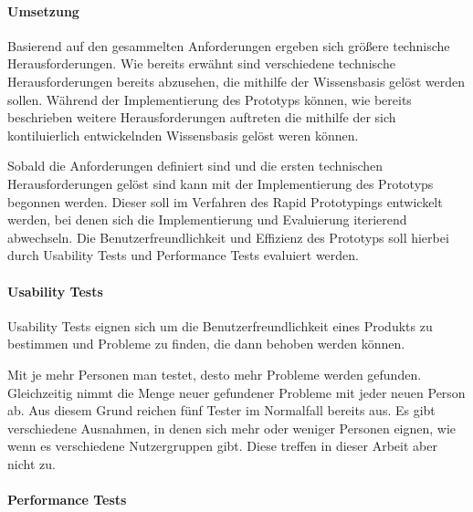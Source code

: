 \paragraph{Umsetzung}

Basierend auf den gesammelten Anforderungen ergeben sich größere technische Herausforderungen. Wie bereits erwähnt sind verschiedene technische Herausforderungen bereits abzusehen, die mithilfe der Wissensbasis gelöst werden sollen. Während der Implementierung des Prototyps können, wie bereits beschrieben weitere Herausforderungen auftreten die mithilfe der sich kontiluierlich entwickelnden Wissensbasis gelöst weren können.

Sobald die Anforderungen definiert sind und die ersten technischen Herausforderungen gelöst sind kann mit der Implementierung des Prototyps begonnen werden. Dieser soll im Verfahren des Rapid Prototypings entwickelt werden, bei denen sich die Implementierung und Evaluierung iterierend abwechseln. Die Benutzerfreundlichkeit und Effizienz des Prototyps soll hierbei durch Usability Tests und Performance Tests evaluiert werden.

\paragraph{Usability Tests}

Usability Tests eignen sich um die Benutzerfreundlichkeit eines Produkts zu bestimmen und Probleme zu finden, die dann behoben werden können.

Mit je mehr Personen man testet, desto mehr Probleme werden gefunden. Gleichzeitig nimmt die Menge neuer gefundener Probleme mit jeder neuen Person ab. Aus diesem Grund reichen fünf Tester im Normalfall bereits aus. Es gibt verschiedene Ausnahmen, in denen sich mehr oder weniger Personen eignen, wie wenn es verschiedene Nutzergruppen gibt. Diese treffen in dieser Arbeit aber nicht zu. 

\paragraph{Performance Tests}
